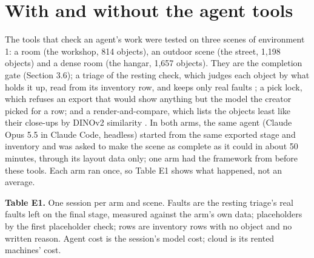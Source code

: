 \section{With and without the agent tools}\label{with-and-without-the-agent-tools}

The tools that check an agent's work were tested on three scenes of environment 1: a room (the workshop, 814 objects), an outdoor scene (the street, 1,198 objects) and a dense room (the hangar, 1,657 objects). They are the completion gate (Section 3.6); a triage of the resting check, which judges each object by what holds it up, read from its inventory row, and keeps only real faults \citep{tam2025sceneeval, xia2026sage}; a pick lock, which refuses an export that would show anything but the model the creator picked for a row; and a render-and-compare, which lists the objects least like their close-ups by DINOv2 similarity \citep{oquab2023dinov2}. In both arms, the same agent (Claude Opus 5.5 in Claude Code, headless) started from the same exported stage and inventory and was asked to make the scene as complete as it could in about 50 minutes, through its layout data only; one arm had the framework from before these tools. Each arm ran once, so Table E1 shows what happened, not an average.

\par{}\ifdim\dimexpr\pagegoal-\pagetotal\relax<12\baselineskip\clearpage\fi

\textbf{Table E1.} One session per arm and scene. Faults are the resting triage's real faults left on the final stage, measured against the arm's own data; placeholders by the first placeholder check; rows are inventory rows with no object and no written reason. Agent cost is the session's model cost; cloud is its rented machines' cost.

\begingroup\footnotesize\setlength{\tabcolsep}{3pt}

